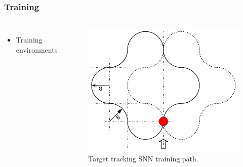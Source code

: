 \begin{frame}
	\frametitle{Training}
	\begin{columns}
			\begin{itemize}
				\item <1-> Training environments
			\end{itemize}
			\begin{overprint}
				\begin{figure}
					\centering
					\includegraphics[width=\textwidth]{img/tf_training_path.pdf}
					\caption{Target tracking SNN training path.}
					\label{fig:tf_training_path}
				\end{figure}
				\begin{figure}
					\centering

\end{figure}
\end{overprint}
\end{columns}
\end{frame}

